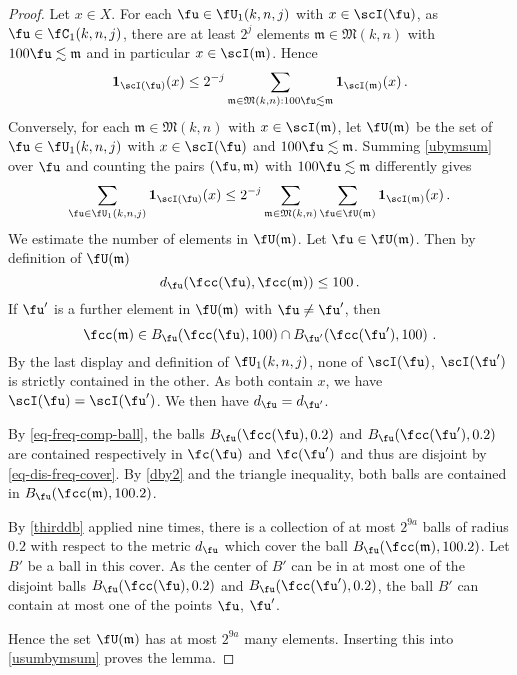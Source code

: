 \begin{proof}
Let $x\in X$. For each
$\fu\in \fU_1(k,n,j)$ with $x\in \scI(\fu)$, as $\fu \in \fC_1(k,n,j)$,
there are at least $2^{j}$ elements $\mathfrak{m}\in \mathfrak{M}(k,n)$
with $100\fu \lesssim \mathfrak{m}$ and in particular
$x\in \scI(\mathfrak{m})$. Hence
\begin{equation}\label{ubymsum}
     \mathbf{1}_{\scI(\fu)}(x)
    \le 2^{-j}\sum_{\mathfrak{m} \in \mathfrak{M}(k,n): 100\fu\lesssim \mathfrak{m}} \mathbf{1}_{\scI(\mathfrak{m})}(x)\, .
\end{equation}
Conversely, for each $\mathfrak{m}\in \mathfrak{M}(k,n)$
with $x\in \scI(\mathfrak{m})$,
let $\fU(\mathfrak{m})$ be the set of
$\fu\in \fU_1(k,n,j)$ with $x\in \scI(\fu)$
and $100\fu \lesssim \mathfrak{m}$.
Summing \eqref{ubymsum} over $\fu$ and counting the pairs
$(\fu,\mathfrak{m})$ with $100\fu \lesssim \mathfrak{m}$
differently gives
\begin{equation}\label{usumbymsum}
     \sum_{\fu\in \fU_1(k,n,j)} \mathbf{1}_{\scI(\fu)}(x)
    \le 2^{-j}\sum_{\mathfrak{m} \in \mathfrak{M}(k,n)}
    \sum_{\fu \in \fU(\mathfrak{m})} \mathbf{1}_{\scI(\mathfrak{m})}(x)\, .
\end{equation}
We estimate the number of elements in $\fU(\mathfrak{m})$.
Let $\fu \in \fU(\mathfrak{m})$.
Then by definition of
$\fU(\mathfrak{m})$
\begin{equation}\label{dby2}
     d_{\fu}(\fcc(\fu),\fcc(\mathfrak{m}))\le 100\, .
\end{equation}
If $\fu'$ is a further element in $\fU(\mathfrak{m})$ with $\fu\neq \fu'$, then
\begin{equation}
    \fcc(\mathfrak{m})
    \in B_{\fu}(\fcc(\fu),100)\cap B_{\fu'}(\fcc(\fu'),100)\ .
\end{equation}
By the last display and definition of $\fU_1(k,n,j)$, none of $\scI(\fu)$, $\scI(\fu')$ is strictly contained in the other. As both contain $x$, we have $\scI(\fu)=\scI(\fu')$.
We then have $d_{\fu}=d_{\fu'}$.

By \eqref{eq-freq-comp-ball}, the balls
$B_{\fu}(\fcc(\fu),0.2)$ and
$B_{\fu}(\fcc(\fu'),0.2)$ are
contained respectively in $\fc(\fu)$
and $\fc(\fu')$ and thus are disjoint by \eqref{eq-dis-freq-cover}.
By \eqref{dby2} and the triangle inequality, both balls are contained in $B_{\fu}(\fcc(\mathfrak{m}), 100.2)$.

By \eqref{thirddb} applied nine times, there is a collection of at most
$2^{9a}$ balls of radius $0.2$ with respect to the metric $d_{\fu}$ which cover the ball $B_{\fu}(\fcc(\mathfrak{m}),100.2)$.
Let $B'$ be a ball in this cover.
As the center of $B'$ can be in at most one of the disjoint balls
$B_{\fu}(\fcc(\fu),0.2)$ and
$B_{\fu}(\fcc(\fu'),0.2)$,
the ball $B'$ can contain at most
one of the points $\fu$, $\fu'$.

Hence the set $\fU(\mathfrak{m})$ has at most
$2^{9a}$ many elements.
Inserting this into \eqref{usumbymsum} proves the lemma.
\end{proof}

